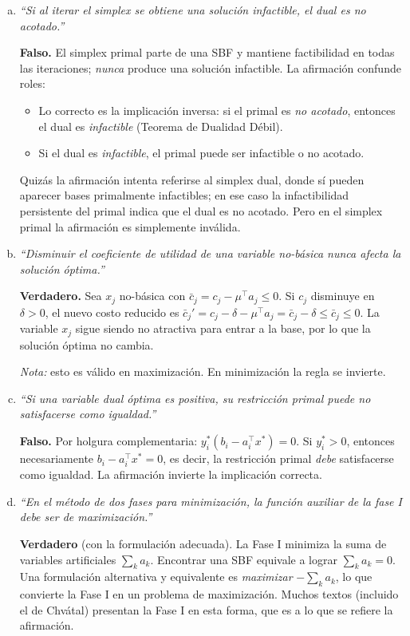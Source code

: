 \documentclass{article}
\begin{document}
\begin{enumerate}[a)]

\item \textit{``Si al iterar el simplex se obtiene una solución infactible, el dual es no acotado.''}

\textbf{Falso.} El simplex primal parte de una SBF y mantiene factibilidad en todas las iteraciones; \emph{nunca} produce una solución infactible. La afirmación confunde roles:
\begin{itemize}
  \item Lo correcto es la implicación inversa: si el primal es \emph{no acotado}, entonces el dual es \emph{infactible} (Teorema de Dualidad Débil).
  \item Si el dual es \emph{infactible}, el primal puede ser infactible o no acotado.
\end{itemize}
Quizás la afirmación intenta referirse al simplex dual, donde sí pueden aparecer bases primalmente infactibles; en ese caso la infactibilidad persistente del primal indica que el dual es no acotado. Pero en el simplex primal la afirmación es simplemente inválida.

\item \textit{``Disminuir el coeficiente de utilidad de una variable no-básica nunca afecta la solución óptima.''}

\textbf{Verdadero.} Sea $x_j$ no-básica con $\bar{c}_j=c_j-\mu^\top a_j\leq0$. Si $c_j$ disminuye en $\delta>0$, el nuevo costo reducido es $\bar{c}_j'=c_j-\delta-\mu^\top a_j=\bar{c}_j-\delta\leq\bar{c}_j\leq0$. La variable $x_j$ sigue siendo no atractiva para entrar a la base, por lo que la solución óptima no cambia.

\textit{Nota:} esto es válido en maximización. En minimización la regla se invierte.

\item \textit{``Si una variable dual óptima es positiva, su restricción primal puede no satisfacerse como igualdad.''}

\textbf{Falso.} Por holgura complementaria: $y_i^*(b_i-a_i^\top x^*)=0$. Si $y_i^*>0$, entonces necesariamente $b_i-a_i^\top x^*=0$, es decir, la restricción primal \emph{debe} satisfacerse como igualdad. La afirmación invierte la implicación correcta.

\item \textit{``En el método de dos fases para minimización, la función auxiliar de la fase I debe ser de maximización.''}

\textbf{Verdadero} (con la formulación adecuada). La Fase I minimiza la suma de variables artificiales $\sum_k a_k$. Encontrar una SBF equivale a lograr $\sum_k a_k=0$. Una formulación alternativa y equivalente es \emph{maximizar} $-\sum_k a_k$, lo que convierte la Fase I en un problema de maximización. Muchos textos (incluido el de Chvátal) presentan la Fase I en esta forma, que es a lo que se refiere la afirmación.

\end{enumerate}
\end{document}
